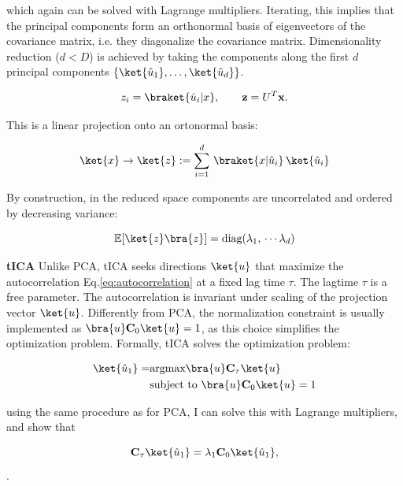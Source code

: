 which again can be solved with Lagrange multipliers. Iterating, this implies that the principal components form an orthonormal basis of eigenvectors of the covariance matrix, i.e. they diagonalize the covariance matrix.
Dimensionality reduction ($d < D$) is achieved by taking the components along the first $d$ 
principal components $\{\ket{\hat{u}_1}, \ldots, \ket{\hat{u}_d}\}$.


\begin{equation}
z_i = \braket{\hat{u}_i|x}, \qquad \mathbf z = U^T \mathbf x.
\end{equation}

This is a linear projection onto an ortonormal basis:

\begin{equation*}
    \ket{x} \rightarrow \ket{z} := \sum_{i = 1}^{d}\, \braket{x | \hat{u}_i}\, \ket{\hat{u}_i} 
\end{equation*}

By construction, in the reduced space components are uncorrelated and ordered by decreasing variance:

\begin{equation}
 \mathbb{E}\!\left[\ket{z}\bra{z}\right] = \text{diag}(\lambda_1,\, \cdots \lambda_d)
\end{equation}
\vspace{1em}

\noindent \textbf{tICA} Unlike PCA, tICA \cite{my_tica_ref} seeks directions $\ket{u}$ that maximize the autocorrelation Eq.\eqref{eq:autocorrelation} at a fixed lag time $\tau$. The lagtime $\tau$ is a free parameter.
The autocorrelation is invariant under scaling of the projection vector $\ket{u}$. Differently from PCA, the normalization constraint is usually implemented as $\bra{u}\mathbf{C}_{0}\ket{u}=1$, as this choice simplifies the optimization problem.
Formally, tICA solves the optimization problem:

\begin{align}
    \label{eq:generalized_eigenvalue_problem}
\ket{\hat{u}_1} =& \text{argmax}\bra{u}\mathbf{C}_{\tau}\ket{u} \notag \\
&\text{subject to}  \,\, \bra{u}\mathbf{C}_{0}\ket{u} = 1
\end{align}

using the same procedure as for PCA, I can solve this with Lagrange multipliers, and show that


\begin{equation}
\mathbf{C}_{\tau}\ket{\hat{u}_1}
=
\lambda_1
\mathbf{C}_{0}\ket{\hat{u}_1},
\end{equation}.

